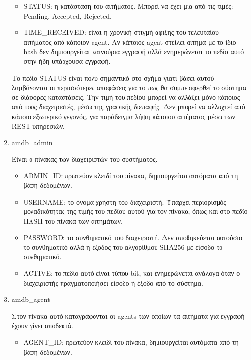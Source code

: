 \documentclass[a4paper,11pt]{article}
\begin{document}
\begin{sloppypar}
\begin{enumerate}
\begin{itemize}
\item STATUS: η κατάσταση του αιτήματος. Μπορεί να έχει μία από τις τιμές: Pending, Accepted, Rejected. 

\item TIME\_RECEIVED: είναι η χρονική στιγμή άφιξης του τελευταίου αιτήματος από κάποιον agent. Αν κάποιος agent στείλει αίτημα με το ίδιο hash δεν δημιουργείται καινούρια εγγραφή αλλά ενημερώνεται το πεδίο αυτό στην ήδη υπάρχουσα εγγραφή.

\end{itemize}

Το πεδίο STATUS είναι πολύ σημαντικό στο σχήμα γιατί βάσει αυτού λαμβάνονται οι περισσότερες αποφάσεις για το πως θα συμπεριφερθεί το σύστημα σε διάφορες καταστάσεις. Την τιμή του πεδίου μπορεί να αλλάξει μόνο κάποιος από τους διαχειριστές, μέσω της γραφικής διεπαφής. Δεν μπορεί να αλλαχτεί από κάποιο εξωτερικό γεγονός, για παράδειγμα λήψη κάποιου αιτήματος μέσω των REST υπηρεσιών. 


\item amdb\_admin

Είναι ο πίνακας των διαχειριστών του συστήματος.
\begin{itemize}

\item ADMIN\_ID: πρωτεύον κλειδί του πίνακα, δημιουργείται αυτόματα από τη βάση δεδομένων.

\item USERNAME: το όνομα χρήστη του διαχειριστή. Υπάρχει περιορισμός μοναδικότητας της τιμής του πεδίου αυτού για τον πίνακα, όπως και στο πεδίο HASH του πίνακα των αιτημάτων.

\item PASSWORD: το συνθηματικό του διαχειριστή. Δεν αποθηκεύεται αυτούσιο το συνθηματικό αλλά η έξοδος του αλγορίθμου SHA256 με είσοδο το συνθηματικό.

\item ACTIVE: το πεδίο αυτό είναι τύπου bit, και ενημερώνεται ανάλογα όταν ο διαχειριστής πραγματοποιήσει είσοδο ή έξοδο από το σύστημα.

\end{itemize}


\item amdb\_agent

Στον πίνακα αυτό καταγράφονται οι agents των οποίων τα αιτήματα για εγγραφή έχουν γίνει αποδεκτά.
\begin{itemize}

\item AGENT\_ID: πρωτεύον κλειδί του πίνακα, δημιουργείται αυτόματα από τη βάση δεδομένων.


\end{itemize}
\end{enumerate}
\end{sloppypar}
\end{document}
